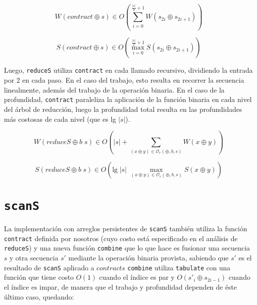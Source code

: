 \documentclass[a4paper,10pt]{article}
\begin{document}
\begin{equation*}
    W \left( contract \oplus s \right) \in
    O \left( \sum_{i=0}^{\frac{\vert s \vert}{2} + 1} W \left( s_{2i} \oplus s_{2i+1} \right) \right)
\end{equation*}

\begin{equation*}
    S \left( contract \oplus s \right) \in
    O \left( \max_{i=0}^{\frac{\vert s \vert}{2} + 1} S \left( s_{2i} \oplus s_{2i+1} \right) \right)
\end{equation*}

Luego, \texttt{reduceS} utiliza \texttt{contract} en cada llamado recursivo,
dividiendo la entrada por 2 en cada paso. En el caso del trabajo, esto resulta
en recorrer la secuencia linealmente, además del trabajo de la operación binaria.
En el caso de la profundidad, \texttt{contract} paraleliza la aplicación de la
función binaria en cada nivel del árbol de reducción, luego la profundidad total
resulta en las profundidades más costosas de cada nivel (que es lg $\vert s \vert$).

\begin{equation*}
    W \left( reduceS \oplus b \; s \right) \in
    O \left( \vert s \vert + \sum_{(x \oplus y) \in \mathcal{O}_r(\oplus,b,s)} W \left( x \oplus y \right) \right)
\end{equation*}

\begin{equation*}
    S \left( reduceS \oplus b \; s \right) \in
    O \left( \text{lg} \; \vert s \vert \; \max_{(x \oplus y) \in \mathcal{O}_r(\oplus,b,s)} S \left( x \oplus y \right) \right)
\end{equation*}

\section*{\texttt{scanS}}

La implementación con arreglos persistentes de \texttt{scanS} también utiliza
la función \texttt{contract} definida por nosotros (cuyo costo está especificado
en el análisis de \texttt{reduceS}) y una nueva función \texttt{combine} que lo
que hace es fusionar una secuencia $s$ y otra secuencia $s'$ mediante la operación
binaria provista, sabiendo que $s'$ es el resultado de \texttt{scanS} aplicado a
$contract s$
\texttt{combine} utiliza \texttt{tabulate} con una función que tiene costo $O \left( 1 \right)$
cuando el índice es par y $O \left( s'_{i} \oplus s_{2i-1} \right)$ cuando el índice 
es impar, de manera que el trabajo y profundidad dependen de éste último caso,
quedando:
\end{document}
